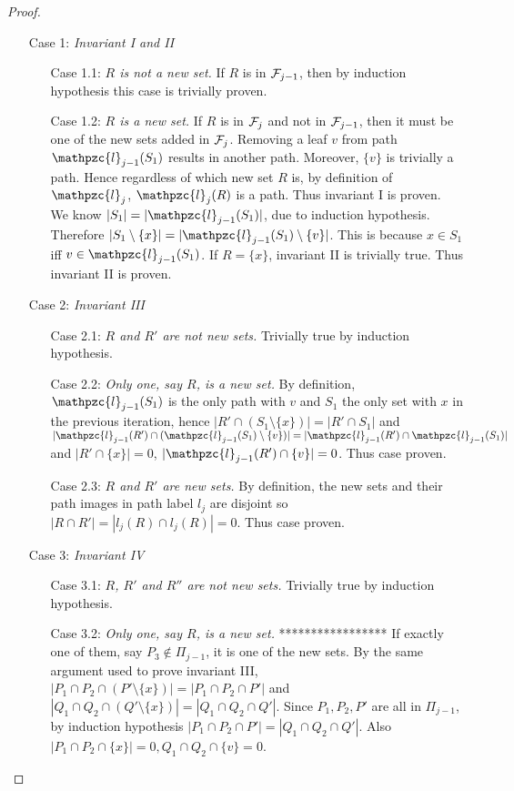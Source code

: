 \documentclass{llncs}
\def\cF{{\cal F}}
\def\cl{\mathpzc{l}}
\begin{document}
\begin{proof}
  \noindent
  \begin{enumerate}
  \item [Case 1:] {\em Invariant I and II} 
    \begin{enumerate}
    \item [Case 1.1:] {\em $R$ is not a new set.} If $R$ is in
      $\cF_{j-1}$, then by induction hypothesis this case is trivially
      proven.
    \item [Case 1.2:] {\em $R$ is a new set.} If $R$ is in $\cF_{j}$
      and not in $\cF_{j-1}$, then it must be one of the new sets
      added in $\cF_j$. Removing a leaf $v$ from path $\cl_{j-1}(S_1)$
      results in another path. Moreover, $\{v\}$ is trivially a
      path. Hence regardless of which new set $R$ is, by definition of
      $\cl_j$, $\cl_{j}(R)$ is a path. Thus invariant I is proven.\\
      We know $|S_1| = |\cl_{j-1}(S_1)|$, due to induction
      hypothesis. Therefore $|S_1 \setminus \{x\}| = |\cl_{j-1}(S_1)
      \setminus \{v\}|$. This is because $x \in S_1$ iff $v \in
      \cl_{j-1}(S_1)$. If $R = \{x\}$, invariant II is trivially
      true. Thus invariant II is proven.
  \end{enumerate}
  \item [Case 2:] {\em Invariant III}
    \begin{enumerate}
    \item [Case 2.1:] {\em $R$ and $R'$ are not new sets.} Trivially
      true by induction hypothesis.
    \item [Case 2.2:] {\em Only one, say $R$, is a new set.} 
  By definition, $\cl_{j-1}(S_1)$ is the only path with $v$ and $S_1$ the
  only set with $x$ in the
  previous iteration, hence $|R' \cap (S_1 \setminus \{x\})| = |R' \cap S_1|$
  and $|\cl_{j-1}(R') \cap (\cl_{j-1}(S_1) \setminus \{v\})| = |\cl_{j-1}(R') \cap \cl_{j-1}(S_1)|$ and $|R' \cap
  \{x\}| = 0$, $|\cl_{j-1}(R') \cap \{v\}| = 0$. Thus case proven.
    \item [Case 2.3:] {\em $R$ and $R'$ are new sets.} By definition,
      the new sets and their path images in path label $l_j$ are
      disjoint so $|R \cap R'| = |l_j(R) \cap l_j(R)| = 0$. Thus case
      proven.
    \end{enumerate}
  \item [Case 3:] {\em Invariant IV}
    \begin{enumerate}
    \item [Case 3.1:] {\em $R$, $R'$ and $R''$ are not new sets.} Trivially
      true by induction hypothesis.
    \item [Case 3.2:] {\em Only one, say $R$, is a new set.}
      *****************  If exactly one of them, say $P_3 \notin \Pi_{j-1}$, it is one of the new sets. By the same argument used to
  prove invariant III, $|P_1 \cap P_2 \cap (P'
  \setminus \{x\})| = |P_1 \cap P_2 \cap P'|$ 
  and $|Q_1 \cap Q_2 \cap (Q' \setminus \{x\})| = |Q_1 \cap Q_2 \cap
  Q'|$. Since $P_1, P_2, P'$ are all in $\Pi_{j-1}$, by induction hypothesis
  $|P_1 \cap P_2 \cap P'| = |Q_1 \cap Q_2 \cap Q'|$. Also $|P_1 \cap
  P_2 \cap \{x\}| = 0, Q_1 \cap Q_2 \cap \{v\} = 0$. 




\end{enumerate}
\end{enumerate}
\end{proof}
\end{document}
